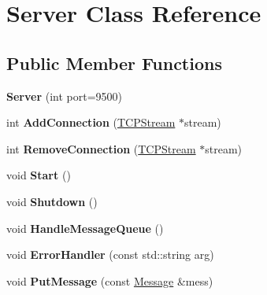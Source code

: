 \hypertarget{class_server}{}\section{Server Class Reference}
\label{class_server}
\subsection*{Public Member Functions}
\begin{DoxyCompactItemize}
\item 
\hypertarget{class_server_a4657bcf0d9581bbfa0c9b2acd043a346}{}{\bfseries Server} (int port=9500)\label{class_server_a4657bcf0d9581bbfa0c9b2acd043a346}

\item 
\hypertarget{class_server_a2090e5239076aa11734d768d99951c00}{}int {\bfseries Add\+Connection} (\hyperlink{class_t_c_p_stream}{T\+C\+P\+Stream} $\ast$stream)\label{class_server_a2090e5239076aa11734d768d99951c00}

\item 
\hypertarget{class_server_a15a94eaa4ca5be5db9a65173b6532257}{}int {\bfseries Remove\+Connection} (\hyperlink{class_t_c_p_stream}{T\+C\+P\+Stream} $\ast$stream)\label{class_server_a15a94eaa4ca5be5db9a65173b6532257}

\item 
\hypertarget{class_server_acaea883b722927c7d8299a74447c8d1b}{}void {\bfseries Start} ()\label{class_server_acaea883b722927c7d8299a74447c8d1b}

\item 
\hypertarget{class_server_a244a84a1e412dd7954ae874456536b39}{}void {\bfseries Shutdown} ()\label{class_server_a244a84a1e412dd7954ae874456536b39}

\item 
\hypertarget{class_server_a5a1df33cb73f1b66e986ef477fe8c530}{}void {\bfseries Handle\+Message\+Queue} ()\label{class_server_a5a1df33cb73f1b66e986ef477fe8c530}

\item 
\hypertarget{class_server_aeb68e272f180a531cb98eb0c6d5db368}{}void {\bfseries Error\+Handler} (const std\+::string arg)\label{class_server_aeb68e272f180a531cb98eb0c6d5db368}

\item 
\hypertarget{class_server_a8a0f5d1fcef3492463905f813b699574}{}void {\bfseries Put\+Message} (const \hyperlink{class_message}{Message} \&mess)\label{class_server_a8a0f5d1fcef3492463905f813b699574}

\end{DoxyCompactItemize}

